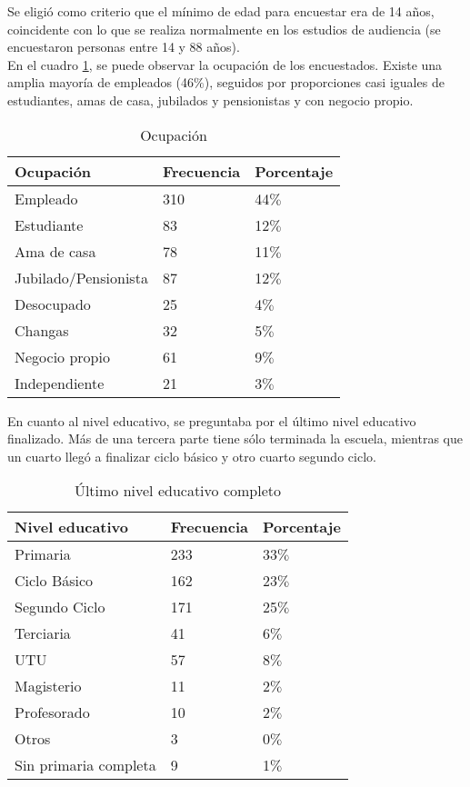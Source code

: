 \indent Se eligió como criterio que el mínimo de edad para encuestar era de 14 años, coincidente con lo que se realiza normalmente en los estudios de audiencia (se encuestaron personas entre 14 y 88 años).\\


\indent En el cuadro \ref{OcupaTabla}, se puede observar la ocupación de los encuestados. Existe una amplia mayoría de empleados (46$\%$), seguidos por proporciones casi iguales de estudiantes, amas de casa, jubilados y pensionistas y con negocio propio.\\

\begin{table}[htpb]
	\centering
{}
		\begin{tabular}{|l|l|l|}\hline
      	\textbf{Ocupación}&\textbf{Frecuencia}&\textbf{Porcentaje}\\\hline\hline
			Empleado	&	310&	44$\%$\\\hline
			Estudiante 	&	83&	12$\%$\\\hline
			Ama de casa 	&	78&	11$\%$\\\hline
			Jubilado/Pensionista 	&	87&	12$\%$\\\hline
			Desocupado 	&	25&	4$\%$\\\hline
			Changas 	&	32&	5$\%$\\\hline
			Negocio propio 	&	61&	9$\%$\\\hline
			Independiente	&	21&	3$\%$\\\hline
		\end{tabular}
	  \caption{Ocupación}
	  \label{OcupaTabla}
\end{table}


\indent En cuanto al nivel educativo, se preguntaba por el último nivel educativo finalizado. Más de una tercera parte tiene sólo terminada la escuela, mientras que un cuarto llegó a finalizar ciclo básico y otro cuarto segundo ciclo.\\

\begin{table}[ht]
	\centering
{}
		\begin{tabular}{|l|l|l|}\hline
      	\textbf{Nivel educativo}&\textbf{Frecuencia}&\textbf{Porcentaje}\\\hline\hline
			Primaria	&	233&	33$\%$\\\hline
			Ciclo Básico 	&	162&	23$\%$\\\hline
			Segundo Ciclo 	&	171&	25$\%$\\\hline
			Terciaria 	&	41&	6$\%$\\\hline
			UTU 	&	57&	8$\%$\\\hline
			Magisterio 	&	11&	2$\%$\\\hline
			Profesorado 	&	10&	2$\%$\\\hline
			Otros 	&	3&	0$\%$\\\hline			
			Sin primaria completa	&	9&	1$\%$\\\hline
		\end{tabular}
	  \caption{Último nivel educativo completo}
	  \label{EscolarTabla}
\end{table}


